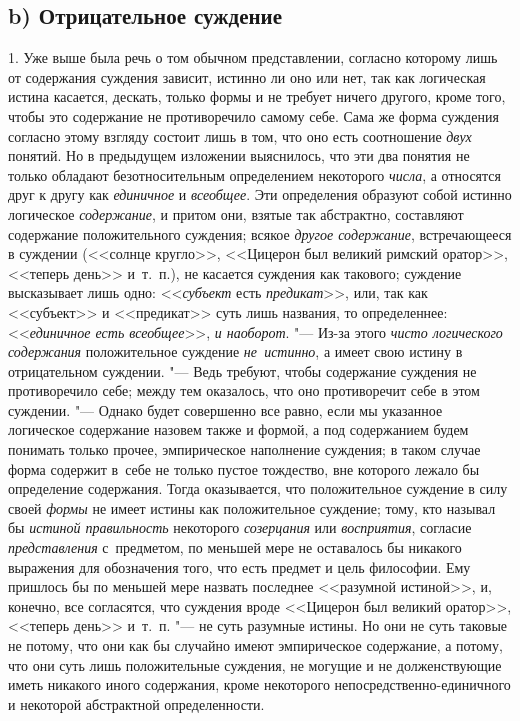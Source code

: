\subsection[b) Отрицательное суждение]{b) Отрицательное суждение}

1. Уже выше была речь о том обычном представлении, согласно
которому лишь от содержания суждения зависит, истинно ли оно или нет, так
как логическая истина касается, дескать, только формы и не требует ничего
другого, кроме того, чтобы это содержание не противоречило самому себе.
Сама же форма суждения согласно этому взгляду состоит лишь в том, что оно
есть соотношение {\em двух} понятий. Но в предыдущем изложении выяснилось, что
эти два понятия не только обладают безотносительным определением некоторого
{\em числа}, а относятся друг к другу как {\em единичное} и {\em всеобщее}.
Эти определения образуют собой истинно логическое {\em содержание}, и притом
они, взятые так абстрактно, составляют содержание положительного суждения;
всякое {\em другое содержание}, встречающееся в суждении (<<солнце кругло>>,
<<Цицерон был великий римский оратор>>, <<теперь день>> и~т.~п.), не касается
суждения как такового; суждение высказывает лишь одно: <<{\em субъект} есть
{\em предикат}>>, или, так как <<субъект>> и <<предикат>> суть лишь названия,
то определеннее: <<{\em единичное есть всеобщее}>>, {\em и наоборот}. "---
Из-за этого {\em чисто логического содержания} положительное суждение
{\em не~истинно}, а имеет свою истину в отрицательном суждении. "--- Ведь
требуют, чтобы содержание суждения не противоречило себе; между тем оказалось,
что оно противоречит себе в этом суждении. "--- Однако будет совершенно
все равно, если мы указанное логическое содержание назовем также и формой,
а под содержанием будем понимать только прочее, эмпирическое наполнение
суждения; в таком случае форма содержит в~себе не только пустое тождество,
вне которого лежало бы определение содержания. Тогда оказывается, что
положительное суждение в силу своей {\em формы} не имеет
истины как положительное суждение; тому, кто называл бы
{\em истиной правильность} некоторого {\em созерцания} или
{\em восприятия}, согласие {\em представления} с~предметом,
по меньшей мере не оставалось бы никакого выражения для
обозначения того, что есть предмет и цель философии. Ему пришлось бы по
меньшей мере назвать последнее <<разумной истиной>>, и, конечно, все
согласятся, что суждения вроде <<Цицерон был великий оратор>>, <<теперь день>>
и~т.~п. "--- не суть разумные истины. Но они не суть таковые не
потому, что они как бы случайно имеют эмпирическое содержание, а потому,
что они суть лишь положительные суждения, не могущие и не долженствующие
иметь никакого иного содержания, кроме некоторого
непосредственно-единичного и некоторой абстрактной определенности.

